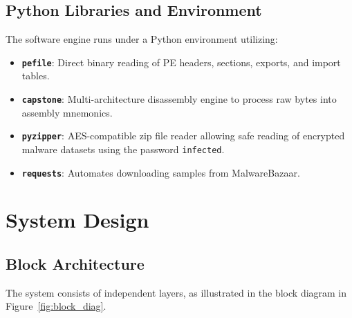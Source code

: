 \documentclass[11pt,a4paper]{article}
\begin{document}
\subsection{Python Libraries and Environment}
The software engine runs under a Python environment utilizing:
\begin{itemize}
    \item \textbf{\texttt{pefile}}: Direct binary reading of PE headers, sections, exports, and import tables.
    \item \textbf{\texttt{capstone}}: Multi-architecture disassembly engine to process raw bytes into assembly mnemonics.
    \item \textbf{\texttt{pyzipper}}: AES-compatible zip file reader allowing safe reading of encrypted malware datasets using the password \texttt{infected}.
    \item \textbf{\texttt{requests}}: Automates downloading samples from MalwareBazaar.
\end{itemize}

\newpage

\section{System Design}

\subsection{Block Architecture}
The system consists of independent layers, as illustrated in the block diagram in Figure~\ref{fig:block_diag}.
\end{document}

